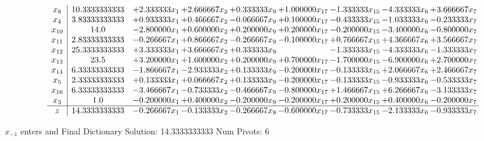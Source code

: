 \documentclass[10pt]{article}
\begin{document}
 \[\begin{array}{c| c c@{\hskip 2pt} c@{\hskip 2pt} c@{\hskip 2pt} c@{\hskip 2pt} c@{\hskip 2pt} c@{\hskip 2pt} c@{\hskip 2pt} }
 x_{8}   &  10.3333333333 & + 2.333333 x_{1} & + 2.666667 x_{2} & + 0.333333 x_{9} & + 1.000000 x_{17} & -1.333333 x_{15} & -4.333333 x_{6} & + 3.666667 x_{7}\\
 x_{4}   &  3.83333333333 & + 0.933333 x_{1} & + 0.466667 x_{2} & -0.066667 x_{9} & + 0.100000 x_{17} & -0.433333 x_{15} & -1.033333 x_{6} & -0.233333 x_{7}\\
 x_{10}   &  14.0 & -2.800000 x_{1} & + 0.600000 x_{2} & + 0.200000 x_{9} & + 0.200000 x_{17} & -0.200000 x_{15} & -3.400000 x_{6} & -0.800000 x_{7}\\
 x_{11}   &  2.83333333333 & -0.266667 x_{1} & + 0.866667 x_{2} & -0.266667 x_{9} & -0.100000 x_{17} & + 0.766667 x_{15} & + 4.366667 x_{6} & + 3.566667 x_{7}\\
 x_{12}   &  25.3333333333 & + 3.333333 x_{1} & + 3.666667 x_{2} & + 0.333333 x_{9} &   & -1.333333 x_{15} & -4.333333 x_{6} & -1.333333 x_{7}\\
 x_{13}   &  23.5 & + 3.200000 x_{1} & + 1.600000 x_{2} & + 0.200000 x_{9} & + 0.700000 x_{17} & -1.700000 x_{15} & -6.900000 x_{6} & + 2.700000 x_{7}\\
 x_{14}   &  6.33333333333 & -1.866667 x_{1} & -2.933333 x_{2} & + 0.133333 x_{9} & -0.200000 x_{17} & -0.133333 x_{15} & + 2.066667 x_{6} & + 2.466667 x_{7}\\
 x_{5}   &  2.33333333333 & + 0.133333 x_{1} & + 0.066667 x_{2} & + 0.133333 x_{9} & -0.200000 x_{17} & -0.133333 x_{15} & -0.933333 x_{6} & -0.533333 x_{7}\\
 x_{16}   &  6.33333333333 & -3.466667 x_{1} & -0.733333 x_{2} & -0.466667 x_{9} & -0.800000 x_{17} & + 1.466667 x_{15} & + 6.266667 x_{6} & -3.133333 x_{7}\\
 x_{3}   &  1.0 & -0.200000 x_{1} & + 0.400000 x_{2} & -0.200000 x_{9} & -0.200000 x_{17} & + 0.200000 x_{15} & + 0.400000 x_{6} & -0.200000 x_{7}\\
\hline
z    &  14.3333333333 & -0.266667 x_{1} & -0.133333 x_{2} & -0.266667 x_{9} & -0.600000 x_{17} & -0.733333 x_{15} & -2.133333 x_{6} & -0.933333 x_{7}\\
\end{array}\]


 $ x_{-1} $ enters and Final Dictionary
Solution:  14.3333333333
Num Pivots:  6
\end{document}
